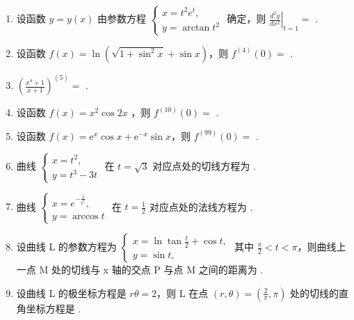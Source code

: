\documentclass[12pt, a4paper]{ctexart}
\begin{document}
\begin{enumerate}[start=39]
    \item 设函数 $ y = y(x) $ 由参数方程 $ \begin{cases} x = t^2 e^t, \\ y = \arctan t^2 \end{cases} $ 确定，则 $ \left. \frac{d^2 y}{dx^2} \right|_{t=1} = $ \underline{\hspace{2cm}}.

    \item 设函数 $ f(x)=\ln\left(\sqrt{1+\sin^{2}x}+\sin x\right) $，则 $ f^{(4)}(0)= $ \underline{\hspace{2cm}}.

    \item $ \left(\frac{x^{4}+1}{x+1}\right)^{(5)}= $ \underline{\hspace{2cm}}.

    \item 设函数 $ f(x)=x^{2}\cos2x $ ，则 $ f^{(10)}(0)= $ \underline{\hspace{2cm}}.

    \item 设函数 $ f(x)=\mathrm{e}^{x}\cos x+\mathrm{e}^{-x}\sin x $，则 $ f^{(99)}(0)= $ \underline{\hspace{2cm}}.

    \item 曲线 $ \begin{cases} x = t^{2}, \\ y = t^{3} - 3t \end{cases} $ 在 $ t = \sqrt{3} $ 对应点处的切线方程为 \underline{\hspace{2cm}}.

    \item 曲线 $ \begin{cases} x = e^{-\frac{1}{t^2}}, \\ y = \arccos t \end{cases} $ 在 $ t = \frac{1}{2} $ 对应点处的法线方程为 \underline{\hspace{2cm}}.

    \item 设曲线 L 的参数方程为 $ \begin{cases} x = \ln \tan \frac{t}{2} + \cos t, \\ y = \sin t, \end{cases} $ 其中 $ \frac{\pi}{2} < t < \pi $，则曲线上一点 M 处的切线与 x 轴的交点 P 与点 M 之间的距离为 \underline{\hspace{2cm}}.

    \item 设曲线 L 的极坐标方程是 $ r\theta=2 $，则 L 在点 $ (r,\theta)=\left(\frac{2}{\pi},\pi\right) $ 处的切线的直角坐标方程是 \underline{\hspace{2cm}}.


\end{enumerate}
\end{document}
